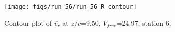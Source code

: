 \begin{figure}[H]
\centering
\texttt{[image: figs/run\_56/run\_56\_R\_contour]}
\caption{Contour plot of $\overline{v_{r}}$ at $z/c$=9.50, $V_{free}$=24.97, station 6.}
\label{fig:run_56_R_contour}
\end{figure}


